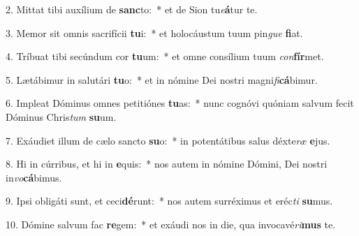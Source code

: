 2. Mittat tibi auxílium de \textbf{sanc}to:~*  et de Sion tu\textit{e}\textbf{á}tur te.\

3. Memor sit omnis sacrifícii \textbf{tu}i:~*  et holocáustum tuum pin\textit{gue} \textbf{fi}at.\

4. Tríbuat tibi secúndum cor \textbf{tu}um:~*  et omne consílium tuum \textit{con}\textbf{fír}met.\

5. Lætábimur in salutári \textbf{tu}o:~*  et in nómine Dei nostri magni\textit{fi}\textbf{cá}bimur.\

6. Impleat Dóminus omnes petitiónes \textbf{tu}as:~*  nunc cognóvi quóniam salvum fecit Dóminus Chris\textit{tum} \textbf{su}um.\

7. Exáudiet illum de cælo sancto \textbf{su}o:~*  in potentátibus salus déxte\textit{ræ} \textbf{e}jus.\

8. Hi in cúrribus, et hi in \textbf{e}quis:~*  nos autem in nómine Dómini, Dei nostri in\textit{vo}\textbf{cá}bimus.\

9. Ipsi obligáti sunt, et ceci\textbf{dé}runt:~*  nos autem surréximus et eréc\textit{ti} \textbf{su}mus.\

10. Dómine salvum fac \textbf{re}gem:~*  et exáudi nos in die, qua invocavé\textit{ri}\textbf{mus} te.\

